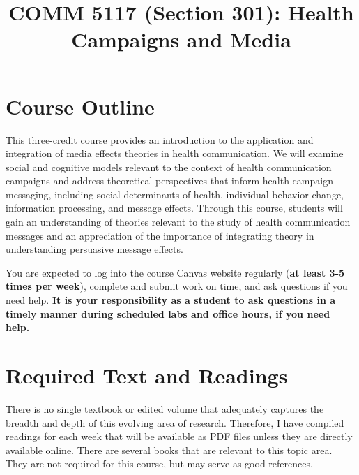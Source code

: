 \documentclass[
  letterpaper,
]{article}
\title{COMM 5117 (Section 301): Health Campaigns and Media}
\subtitle{Mondays - Fridays (9:00 am - 12:00 pm)\\
Location: TBD\\
\strut \\
Professor: Dr.~Sara K. Yeo\\
Email: \href{mailto:sara.yeo@utah.edu}{\nolinkurl{sara.yeo@utah.edu}}}
\author{}
\date{}
\begin{document}
\maketitle


\section{Course Outline}\label{sec-outline}

This three-credit course provides an introduction to the application and
integration of media effects theories in health communication. We will
examine social and cognitive models relevant to the context of health
communication campaigns and address theoretical perspectives that inform
health campaign messaging, including social determinants of health,
individual behavior change, information processing, and message effects.
Through this course, students will gain an understanding of theories
relevant to the study of health communication messages and an
appreciation of the importance of integrating theory in understanding
persuasive message effects.

\begin{tcolorbox}[enhanced jigsaw, left=2mm, toptitle=1mm, opacitybacktitle=0.6, leftrule=.75mm, title=\textcolor{quarto-callout-note-color}{\faInfo}\hspace{0.5em}{Note}, colback=white, colframe=quarto-callout-note-color-frame, toprule=.15mm, rightrule=.15mm, coltitle=black, arc=.35mm, bottomtitle=1mm, colbacktitle=quarto-callout-note-color!10!white, breakable, bottomrule=.15mm, titlerule=0mm, opacityback=0]

You are expected to log into the course Canvas website regularly
(\textbf{at least 3-5 times per week}), complete and submit work on
time, and ask questions if you need help. \textbf{It is your
responsibility as a student to ask questions in a timely manner during
scheduled labs and office hours, if you need help.}

\end{tcolorbox}

\section{Required Text and Readings}\label{sec-text}

There is no single textbook or edited volume that adequately captures
the breadth and depth of this evolving area of research. Therefore, I
have compiled readings for each week that will be available as PDF files
unless they are directly available online. There are several books that
are relevant to this topic area. They are not required for this course,
but may serve as good references.
\end{document}
